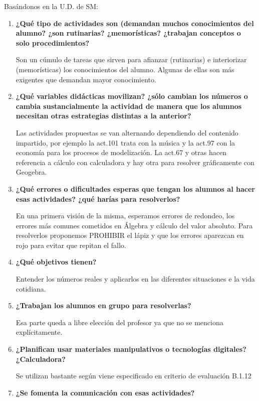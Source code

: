 Basándonos en la U.D. de SM:

\begin{enumerate}
\item \textbf{¿Qué tipo de actividades son (demandan muchos conocimientos del alumno? ¿son rutinarias? ¿memorísticas? ¿trabajan conceptos o solo procedimientos? }

Son un cúmulo de tareas que sirven para afianzar (rutinarias) e interiorizar (memorísticas) los conocimientos del alumno. Algunas de ellas son más exigentes que demandan mayor conocimiento.

\item \textbf{¿Qué variables didácticas movilizan? ¿sólo cambian los números o cambia sustancialmente la actividad de manera que los alumnos necesitan otras estrategias distintas a la anterior? }

Las actividades propuestas se van alternando dependiendo del contenido impartido, por ejemplo la act.101 trata con la música y la act.97 con la economía para los procesos de modelización. La act.67 y otras hacen referencia a cálculo con calculadora y hay otra para resolver gráficamente con Geogebra.

\item \textbf{¿Qué errores o dificultades esperas que tengan los alumnos al hacer esas actividades? ¿qué harías para resolverlos? }

En una primera visión de la misma, esperamos errores de redondeo, los errores más comunes cometidos en Álgebra y cálculo del valor absoluto.
Para resolverlos proponemos PROHIBIR el lápiz y que los errores aparezcan en rojo para evitar que repitan el fallo.

\item \textbf{¿Qué objetivos tienen? }

Entender los números reales y aplicarlos en las diferentes situaciones e la vida cotidiana.

\item \textbf{¿Trabajan los alumnos en grupo para resolverlas? }

Esa parte queda a libre elección del profesor ya que no se menciona explícitamente.

\item \textbf{¿Planifican usar materiales manipulativos o tecnologías digitales? ¿Calculadora? }

Se utilizan bastante según viene especificado en criterio de evaluación B.1.12

\item \textbf{¿Se fomenta la comunicación con esas actividades? }



\end{enumerate}
